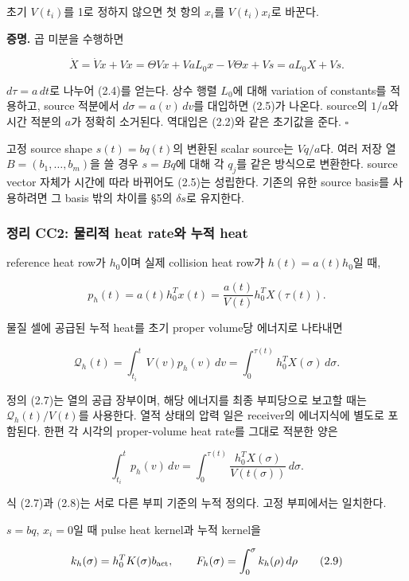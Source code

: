 초기 \(V(t_i)\)를 1로 정하지 않으면 첫 항의 \(x_i\)를 \(V(t_i)x_i\)로 바꾼다.

\textbf{증명.} 곱 미분을 수행하면

\[
\dot X=\dot Vx+V\dot x
=\Theta Vx+VaL_0x-V\Theta x+Vs
=aL_0X+Vs.
\]

\(d\tau=a\,dt\)로 나누어 (2.4)를 얻는다. 상수 행렬 \(L_0\)에 대해 variation of constants를 적용하고, source 적분에서 \(d\sigma=a(v)\,dv\)를 대입하면 (2.5)가 나온다. source의 \(1/a\)와 시간 적분의 \(a\)가 정확히 소거된다. 역대입은 (2.2)와 같은 초기값을 준다. \(\square\)

고정 source shape \(s(t)=bq(t)\)의 변환된 scalar source는 \(Vq/a\)다. 여러 저장 열 \(B=(b_1,\ldots,b_m)\)을 쓸 경우 \(s=Bq\)에 대해 각 \(q_j\)를 같은 방식으로 변환한다. source vector 자체가 시간에 따라 바뀌어도 (2.5)는 성립한다. 기존의 유한 source basis를 사용하려면 그 basis 밖의 차이를 §5의 \(\delta s\)로 유지한다.

\hypertarget{uxc815uxb9ac-cc2-uxbb3cuxb9acuxc801-heat-rateuxc640-uxb204uxc801-heat}{%
\subsubsection{정리 CC2: 물리적 heat rate와 누적 heat}\label{uxc815uxb9ac-cc2-uxbb3cuxb9acuxc801-heat-rateuxc640-uxb204uxc801-heat}}

reference heat row가 \(h_0\)이며 실제 collision heat row가 \(h(t)=a(t)h_0\)일 때,

\[
\boxed{
p_h(t)=a(t)h_0^Tx(t)
=\frac{a(t)}{V(t)}h_0^TX(\tau(t)).
}
\tag{2.6}
\]

물질 셀에 공급된 누적 heat를 초기 proper volume당 에너지로 나타내면

\[
\boxed{
\mathcal Q_h(t)
=\int_{t_i}^{t}V(v)p_h(v)\,dv
=\int_0^{\tau(t)}h_0^TX(\sigma)\,d\sigma.
}
\tag{2.7}
\]

정의 (2.7)는 열의 공급 장부이며, 해당 에너지를 최종 부피당으로 보고할 때는 \(\mathcal Q_h(t)/V(t)\)를 사용한다. 열적 상태의 압력 일은 receiver의 에너지식에 별도로 포함된다. 한편 각 시각의 proper-volume heat rate를 그대로 적분한 양은

\[
\int_{t_i}^{t}p_h(v)\,dv
=\int_0^{\tau(t)}
\frac{h_0^TX(\sigma)}{V(t(\sigma))}\,d\sigma.
\tag{2.8}
\]

식 (2.7)과 (2.8)는 서로 다른 부피 기준의 누적 정의다. 고정 부피에서는 일치한다.

\(s=bq\), \(x_i=0\)일 때 pulse heat kernel과 누적 kernel을

\[
k_h(\sigma)=h_0^TK(\sigma)b_{\rm act},\qquad
F_h(\sigma)=\int_0^\sigma k_h(\rho)\,d\rho
\tag{2.9}
\]


